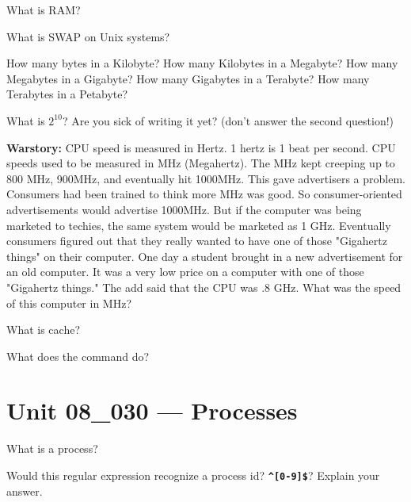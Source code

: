 \documentclass[letterpaper,12pt]{exam}
\newcommand{\unit}{Unit 08}
\begin{document}
\begin {questions}
\begin{samepage}
\question What is RAM? 
\vspace{5mm}
\end{samepage}

\question What is SWAP on Unix systems?
\begin{samepage}
\question How many bytes in a Kilobyte?
\question How many Kilobytes in a Megabyte?
\question How many Megabytes in a Gigabyte?
\question How many Gigabytes in a Terabyte?
\question How many Terabytes in a Petabyte?
\end{samepage}

\question What is $2^{10}$?  Are you sick of writing it yet? (don't answer the second question!)
\vspace{20mm}
\begin {samepage}

\noindent \textbf{Warstory:}  CPU speed is measured in Hertz.  1 hertz is 1 beat per second.  CPU speeds used to be measured in MHz (Megahertz).  The MHz kept creeping up to 800 MHz, 900MHz, and eventually hit 1000MHz.  This gave advertisers a problem.  Consumers had been trained to think more MHz was good.  So consumer-oriented advertisements would advertise 1000MHz.  But if the computer was being marketed to techies, the same system would be marketed as 1 GHz.  Eventually consumers figured out that they really wanted to have one of those "Gigahertz things" on their computer.  
\question One day a student brought in a new advertisement for an old computer.  It was a very low price on a computer with one of those "Gigahertz things."  The add said that the CPU was .8 GHz.   What was the speed of this computer in MHz?
\vspace{15mm}

\end{samepage}
\begin{samepage}
\question What is cache?  
\vspace{5mm}
\end{samepage}

\question What does the  command do?

\section*{\unit\_030 --- Processes}

\question What is a process?
\vspace{10mm}

\question Would this regular expression recognize a process id?  \texttt{\textbf{\textquotesingle\^{}[0-9]\$\textquotesingle}}?  Explain your answer.
\vspace{10mm}


\end{questions}
\end{document}
